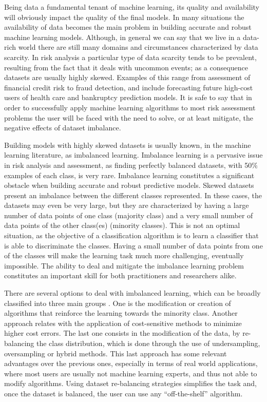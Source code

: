 \documentclass[parskip=full]{scrartcl}
\begin{document}
Being data a fundamental tenant of machine learning, its quality and
availability will obviously impact the quality of the final models. In many
situations the availability of data becomes the main problem in building
accurate and robust machine learning models. Although, in general we can say
that we live in a data-rich world there are still many domains and circumstances
characterized by data scarcity. In risk analysis a particular type of data
scarcity tends to be prevalent, resulting from the fact that it deals with
uncommon events; as a consequence datasets are usually highly skewed. Examples
of this range from assessment of financial credit risk to fraud detection, and
include forecasting future high-cost users of health care and bankruptcy
prediction models. It is safe to say that in order to successfully apply machine
learning algorithms to most risk assessment problems the user will be faced with
the need to solve, or at least mitigate, the negative effects of dataset
imbalance.

Building models with highly skewed datasets is usually known, in the machine
learning literature, as imbalanced learning. Imbalance learning is a pervasive
issue in risk analysis and assessment, as finding perfectly balanced datasets,
with 50\% examples of each class, is very rare. Imbalance learning constitutes a
significant obstacle when building accurate and robust predictive models. Skewed
datasets present an imbalance between the different classes represented. In
these cases, the datasets may even be very large, but they are characterized by
having a large number of data points of one class (majority class) and a very
small number of data points of the other class(es) (minority classes). This is
not an optimal situation, as the objective of a classification algorithm is to
learn a classifier that is able to discriminate the classes. Having a small
number of data points from one of the classes will make the learning task much
more challenging, eventually impossible. The ability to deal and mitigate the
imbalance learning problem constitutes an important skill for both practitioners
and researchers alike.

There are several options to deal with imbalanced learning, which can be broadly
classified into three main groups \cite{Fernandez2013}. One is the
modification or creation of algorithms that reinforce the learning towards the
minority class. Another approach relates with the application of cost-sensitive
methods to minimize higher cost errors. The last one consists in the
modification of the data, by re-balancing the class distribution, which is done
through the use of undersampling, oversampling or hybrid methods. This last
approach has some relevant advantages over the previous ones, especially in
terms of real world applications, where most users are usually not machine
learning experts, and thus not able to modify algorithms. Using dataset
re-balancing strategies simplifies the task and, once the dataset is balanced,
the user can use any “off-the-shelf” algorithm.
\end{document}

